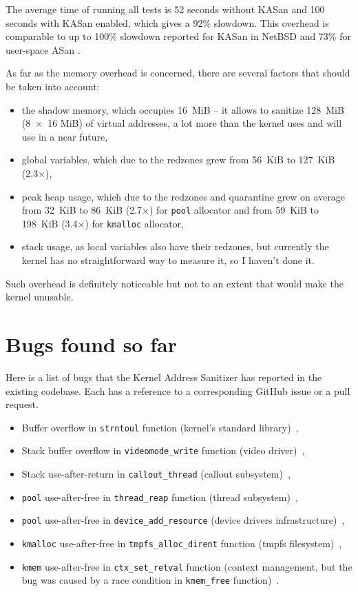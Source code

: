\documentclass[shortabstract, manyadvisors, english, mgr]{iithesis}
\theoremstyle{definition} \newtheorem*{definition}{Definicja}
\theoremstyle{definition} \newtheorem*{example}{Przykład}
\theoremstyle{definition} \newtheorem*{remark}{Uwaga}
\begin{document}
The average time of running all tests is 52 seconds without KASan and 100 seconds with KASan enabled, which gives a 92\% slowdown. This overhead is comparable to up to 100\% slowdown reported for KASan in NetBSD \cite{bib:netbsd-kasan-slowdown} and 73\% for user-space ASan \cite{bib:asan-paper}.

As far as the memory overhead is concerned, there are several factors that should be taken into account:
\begin{itemize}
    \item the shadow memory, which occupies 16~MiB -- it allows to sanitize 128~MiB (8~$\times$~16 MiB) of virtual addresses, a lot more than the kernel uses and will use in a near future,
    \item global variables, which due to the redzones grew from 56~KiB to 127~KiB (2.3$\times$),
    \item peak heap usage, which due to the redzones and quarantine grew on average from 32~KiB to 86~KiB (2.7$\times$) for \texttt{pool} allocator and from 59~KiB to 198~KiB (3.4$\times$) for \texttt{kmalloc} allocator,
    \item stack usage, as local variables also have their redzones, but currently the kernel has no straightforward way to measure it, so I haven't done it.
\end{itemize}

Such overhead is definitely noticeable but not to an extent that would make the kernel unusable.

\section{Bugs found so far}
\label{lbl:bugs-so-far}
Here is a list of bugs that the Kernel Address Sanitizer has reported in the existing codebase. Each has a reference to a corresponding GitHub issue or a pull request.
\begin{itemize}
    \item Buffer overflow in \texttt{strntoul} function (kernel's standard library)~\cite{bib:github635},
    \item Stack buffer overflow in \texttt{videomode\_write} function (video driver)~\cite{bib:github647},
    \item Stack use-after-return in \texttt{callout\_thread} (callout subsystem)~\cite{bib:github678},
    \item \texttt{pool} use-after-free in \texttt{thread\_reap} function (thread subsystem)~\cite{bib:github645},
    \item \texttt{pool} use-after-free in \texttt{device\_add\_resource} (device drivers infrastructure)~\cite{bib:github685},
    \item \texttt{kmalloc} use-after-free in \texttt{tmpfs\_alloc\_dirent} function (tmpfs filesystem)~\cite{bib:github653},
    \item \texttt{kmem} use-after-free in \texttt{ctx\_set\_retval} function (context management, but the bug was caused by a race condition in \texttt{kmem\_free} function)~\cite{bib:github705}.
\end{itemize}
\end{document}

